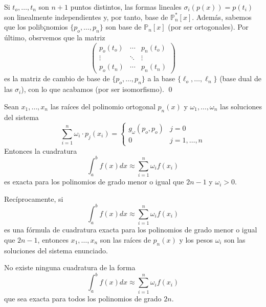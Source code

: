  \begin{dem}
Si $t_o,\ldots,t_n$ son $n+1$ puntos distintos, las formas lineales $\sigma_i(p(x))=p(t_i)$ son linealmente independientes y, por tanto, base de $\mathbb{P}_{n}^*[x]$. Además, sabemos que los polib¡nomios $\{p_o,\ldots,p_n\}$ son base de $\mathbb{P}_n[x]$ (por ser ortogonales). Por último, obsrvemos que la matriz
$$\left(\begin{array}{ccc}
      p_o(t_o)&\cdots   &p_n(t_o)  \\
        \vdots &\ddots&\vdots \\
         p_o(t_n)&\cdots   &p_n(t_n)
    \end{array}\right)$$
    es la matriz de cambio de base de $\{p_o,\ldots,p_n\}$ a la base $\{\ell_o,\ldots,\ell_n\}$ (base dual de las $\sigma_i$), con lo que acabamos (por ser isomorfismo).
 \qed\end{dem}
 \begin{teo}
\item[a)]Sean $x_1,\ldots,x_n$ las raíces del polinomio ortogonal $p_n(x)$ y $\omega_1,\ldots,\omega_n$ las soluciones del sistema
$$\sum_{i=1}^n\omega_i\cdot p_j(x_i)=\left\{\begin{array}{cc}
   g_{\omega}(p_o,p_o)  & j=0  \\
    0 & j=1,\ldots,n
\end{array}\right.$$
Entonces la cuadratura 
$$\int_a^bf(x)dx\approx\sum_{i=1}^n\omega_if(x_i)$$
es exacta para los polinomios de grado menor o igual que $2n-1$ y $\omega_i>0$.
\item[b)] Recíprocamente, si  
$$\int_a^bf(x)dx\approx\sum_{i=1}^n\omega_if(x_i)$$
es una fórmula de cuadratura exacta para los polinomios de grado menor o igual que $2n-1$, entonces $x_1,\ldots,x_n$ son las raíces de $p_n(x)$ y los pesos $\omega_i$ son las soluciones del sistema enunciado.
\item[c)] No existe ninguna cuadratura de la forma 
$$\int_a^bf(x)dx\approx\sum_{i=1}^n\omega_if(x_i)$$
que sea exacta para todos los polinomios de grado $2n$.
 \end{teo}
